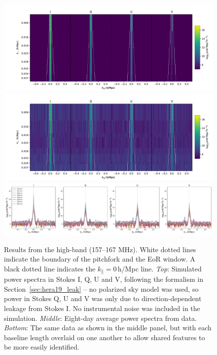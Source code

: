 \begin{figure}[h]
\centering
\includegraphics[scale=0.45]{chapters/eor_window_HERA/figures/timeavg_SIM_high.pdf}
\includegraphics[scale=0.45]{chapters/eor_window_HERA/figures/timeavg_high.pdf}
\includegraphics[scale=0.3]{chapters/eor_window_HERA/figures/timeavg_1d_high.pdf}
\caption[Power spectrum results from the high-band (157--167 MHz).]{Results from the high-band (157--167 MHz). White dotted lines indicate the boundary of the pitchfork and the EoR window. A black dotted line indicates the $k_{\parallel}=0$\,h/Mpc line. \textit{Top}: Simulated power spectra in Stokes I, Q, U and V, following the formalism in Section~\ref{sec:hera19_leak} -- no polarized sky model was used, so power in Stokes Q, U and V was only due to direction-dependent leakage from Stokes I. No instrumental noise was included in the simulation. \textit{Middle}: Eight-day average power spectra from data. \textit{Bottom}: The same data as shown in the middle panel, but with each baseline length overlaid on one another to allow shared features to be more easily identified.}
\label{fig:hera19_pitchforks_highband}
\end{figure}

